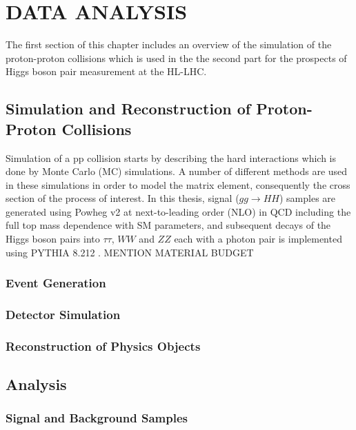 \chapter{DATA ANALYSIS}\label{ch3}

The first section of this chapter includes an overview of the simulation of the proton-proton collisions which is used in the the second part for the prospects of Higgs boson pair measurement at the HL-LHC.

\section{Simulation and Reconstruction of Proton-Proton Collisions}

Simulation of a pp collision starts by describing the hard interactions which is done by Monte Carlo (MC) simulations. A number of different methods are used in these simulations in order to model the matrix element, consequently the cross section of the process of interest. In this thesis, signal ($gg \rightarrow HH$) samples are generated using Powheg v2 \cite{Nason2004, Frixione2007, Alioli2010, Heinrich2019} at next-to-leading order (NLO) in QCD including the full top mass dependence with SM parameters, and subsequent decays of the Higgs boson pairs into $\tau\tau$, $WW$ and $ZZ$ each with a photon pair is implemented using PYTHIA 8.212 \cite{Sjstrand2015}.
MENTION MATERIAL BUDGET
\subsection{Event Generation}

\subsection{Detector Simulation}

\subsection{Reconstruction of Physics Objects}

\section{Analysis}

\subsection{Signal and Background Samples}

